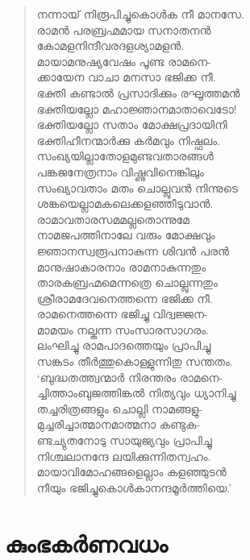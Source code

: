 \begin{verse}
നന്നായ് നിരൂപിച്ചുകൊള്‍ക നീ മാനസേ.\\
രാമന്‍ പരബ്രഹ്മമായ സനാതനന്‍\\
കോമളനിന്ദീവരദളശ്യാമളന്‍.\\
മായാമനുഷ്യവേഷം പൂണ്ട രാമനെ-\\
ക്കായേന വാചാ മനസാ ഭജിക്ക നീ.\\
ഭക്തി കണ്ടാല്‍ പ്രസാദിക്കും രഘൂത്തമന്‍\\
ഭക്തിയല്ലോ മഹാജ്ഞാനമാതാവെടോ!\\
ഭക്തിയല്ലോ സതാം മോക്ഷപ്രദായിനി\\
ഭക്തിഹീനന്മാര്‍ക്കു കര്‍മവും നിഷ്ഫലം.\\
സംഖ്യയില്ലാതോളമുണ്ടവതാരങ്ങള്‍\\
പങ്കജനേത്രനാം വിഷ്ണുവിനെങ്കിലും\\
സംഖ്യാവതാം മതം ചൊല്ലുവന്‍ നിന്നുടെ\\
ശങ്കയെല്ലാമകലെക്കളഞ്ഞീടുവാന്‍.\\
രാമാവതാരസമമല്ലതൊന്നുമേ\\
നാമജപത്തിനാലേ വരും മോക്ഷവും\\
ജ്ഞാനസ്വരൂപനാകുന്ന ശിവന്‍ പരന്‍\\
മാനുഷാകാരനാം രാമനാകുന്നതും\\
താരകബ്രഹ്മമെന്നത്രെ ചൊല്ലുന്നതും\\
ശ്രീരാമദേവനെത്തന്നെ ഭജിക്ക നീ.\\
രാമനെത്തന്നെ ഭജിച്ചു വിദ്വജ്ജന-\\
മാമയം നല്കുന്ന സംസാരസാഗരം.\\
ലംഘിച്ചു രാമപാദത്തെയും പ്രാപിച്ചു\\
സങ്കടം തീര്‍ത്തുകൊള്ളുന്നിതു സന്തതം.\\
‘ബുദ്ധതത്ത്വന്മാര്‍ നിരന്തരം രാമനെ-\\
ച്ചിത്താംബുജത്തിങ്കല്‍ നിത്യവും ധ്യാനിച്ചു\\
തച്ചരിത്രങ്ങളും ചൊല്ലി നാമങ്ങളു-\\
മുച്ചരിച്ചാത്മാനമാത്മനാ കണ്ടുക-\\
ണ്ടച്യുതനോടു സായുജ്യവും പ്രാപിച്ചു\\
നിശ്ചലാനന്ദേ ലയിക്കുന്നിതന്വഹം.\\
മായാവിമോഹങ്ങളെല്ലാം കളഞ്ഞുടന്‍\\
നീയും ഭജിച്ചുകൊള്‍കാനന്ദമൂര്‍ത്തിയെ.’
\end{verse}


\section{കുംഭകര്‍ണവധം}

